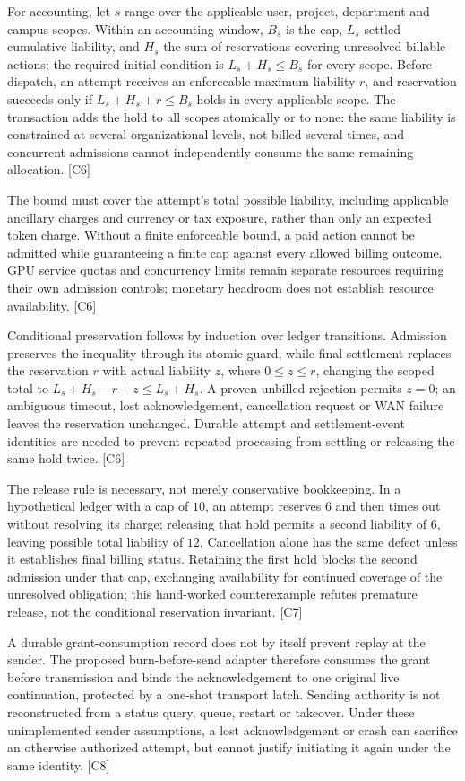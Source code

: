 \documentclass[11pt]{article}
\begin{document}
For accounting, let $s$ range over the applicable user, project, department and campus scopes. Within an accounting window, $B_s$ is the cap, $L_s$ settled cumulative liability, and $H_s$ the sum of reservations covering unresolved billable actions; the required initial condition is $L_s+H_s\leq B_s$ for every scope. Before dispatch, an attempt receives an enforceable maximum liability $r$, and reservation succeeds only if $L_s+H_s+r\leq B_s$ holds in every applicable scope. The transaction adds the hold to all scopes atomically or to none: the same liability is constrained at several organizational levels, not billed several times, and concurrent admissions cannot independently consume the same remaining allocation. [C6]

The bound must cover the attempt's total possible liability, including applicable ancillary charges and currency or tax exposure, rather than only an expected token charge. Without a finite enforceable bound, a paid action cannot be admitted while guaranteeing a finite cap against every allowed billing outcome. GPU service quotas and concurrency limits remain separate resources requiring their own admission controls; monetary headroom does not establish resource availability. [C6]

Conditional preservation follows by induction over ledger transitions. Admission preserves the inequality through its atomic guard, while final settlement replaces the reservation $r$ with actual liability $z$, where $0\leq z\leq r$, changing the scoped total to $L_s+H_s-r+z\leq L_s+H_s$. A proven unbilled rejection permits $z=0$; an ambiguous timeout, lost acknowledgement, cancellation request or WAN failure leaves the reservation unchanged. Durable attempt and settlement-event identities are needed to prevent repeated processing from settling or releasing the same hold twice. [C6]

The release rule is necessary, not merely conservative bookkeeping. In a hypothetical ledger with a cap of $10$, an attempt reserves $6$ and then times out without resolving its charge; releasing that hold permits a second liability of $6$, leaving possible total liability of $12$. Cancellation alone has the same defect unless it establishes final billing status. Retaining the first hold blocks the second admission under that cap, exchanging availability for continued coverage of the unresolved obligation; this hand-worked counterexample refutes premature release, not the conditional reservation invariant. [C7]

A durable grant-consumption record does not by itself prevent replay at the sender. The proposed burn-before-send adapter therefore consumes the grant before transmission and binds the acknowledgement to one original live continuation, protected by a one-shot transport latch. Sending authority is not reconstructed from a status query, queue, restart or takeover. Under these unimplemented sender assumptions, a lost acknowledgement or crash can sacrifice an otherwise authorized attempt, but cannot justify initiating it again under the same identity. [C8]
\end{document}
